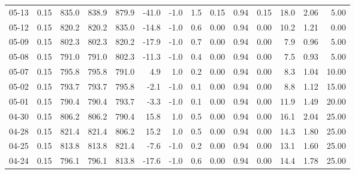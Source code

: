 \begin{threeparttable}
{\begin{tabular}{lrrrrrrrrrrrrr}
  05-13 &     0.15 & 835.0 & 838.9 & 879.9 &      -41.0 &                     -1.0 &                 1.5 &       0.15 &      0.94 &           0.15 &             18.0 &            2.06 &                   5.00 \\
  05-12 &     0.15 & 820.2 & 820.2 & 835.0 &      -14.8 &                     -1.0 &                 0.6 &       0.00 &      0.94 &           0.00 &             10.2 &            1.21 &                   0.00 \\
  05-09 &     0.15 & 802.3 & 802.3 & 820.2 &      -17.9 &                     -1.0 &                 0.7 &       0.00 &      0.94 &           0.00 &              7.9 &            0.96 &                   5.00 \\
  05-08 &     0.15 & 791.0 & 791.0 & 802.3 &      -11.3 &                     -1.0 &                 0.4 &       0.00 &      0.94 &           0.00 &              7.5 &            0.93 &                   5.00 \\
  05-07 &     0.15 & 795.8 & 795.8 & 791.0 &        4.9 &                      1.0 &                 0.2 &       0.00 &      0.94 &           0.00 &              8.3 &            1.04 &                  10.00 \\
  05-02 &     0.15 & 793.7 & 793.7 & 795.8 &       -2.1 &                     -1.0 &                 0.1 &       0.00 &      0.94 &           0.00 &              8.8 &            1.12 &                  15.00 \\
  05-01 &     0.15 & 790.4 & 790.4 & 793.7 &       -3.3 &                     -1.0 &                 0.1 &       0.00 &      0.94 &           0.00 &             11.9 &            1.49 &                  20.00 \\
  04-30 &     0.15 & 806.2 & 806.2 & 790.4 &       15.8 &                      1.0 &                 0.5 &       0.00 &      0.94 &           0.00 &             16.1 &            2.04 &                  25.00 \\
  04-28 &     0.15 & 821.4 & 821.4 & 806.2 &       15.2 &                      1.0 &                 0.5 &       0.00 &      0.94 &           0.00 &             14.3 &            1.80 &                  25.00 \\
  04-25 &     0.15 & 813.8 & 813.8 & 821.4 &       -7.6 &                     -1.0 &                 0.2 &       0.00 &      0.94 &           0.00 &             13.1 &            1.60 &                  25.00 \\
  04-24 &     0.15 & 796.1 & 796.1 & 813.8 &      -17.6 &                     -1.0 &                 0.6 &       0.00 &      0.94 &           0.00 &             14.4 &            1.78 &                  25.00 \\

\end{tabular}}
\end{threeparttable}
